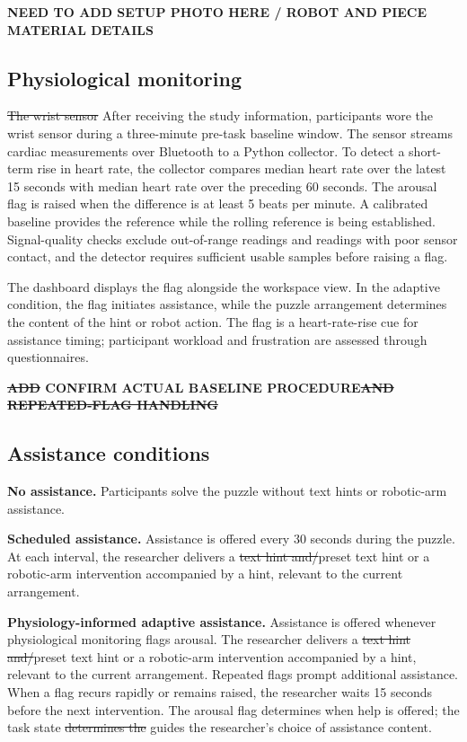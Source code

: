 \documentclass[sigconf,anonymous,balance=false]{aamas} %
\DeclareRobustCommand{\DIFadd}[1]{{\color{reviewadd}#1}} %
\DeclareRobustCommand{\DIFdel}[1]{{\color{reviewdel}\sout{#1}}} %
\providecommand{\DIFaddbegin}{} %
\providecommand{\DIFaddend}{} %
\providecommand{\DIFdelbegin}{} %
\providecommand{\DIFdelend}{} %
\providecommand{\DIFscaledelfig}{0.5}
\newlength{\DIFdelgraphicswidth} %
\newlength{\DIFdelgraphicsheight} %
\providecommand{\DIFaddincludegraphics}[2][]{{\color{blue}\fbox{\DIFOincludegraphics[#1]{#2}}}} %
\providecommand{\DIFdelincludegraphics}[2][]{%
\sbox{\DIFdelgraphicsbox}{\DIFOincludegraphics[#1]{#2}}%
\settoboxwidth{\DIFdelgraphicswidth}{\DIFdelgraphicsbox} %
\settoboxtotalheight{\DIFdelgraphicsheight}{\DIFdelgraphicsbox} %
\scalebox{\DIFscaledelfig}{%
\parbox[b]{\DIFdelgraphicswidth}{\usebox{\DIFdelgraphicsbox}\\[-\baselineskip] \rule{\DIFdelgraphicswidth}{0em}}\llap{\resizebox{\DIFdelgraphicswidth}{\DIFdelgraphicsheight}{%
\setlength{\unitlength}{\DIFdelgraphicswidth}%
\begin{picture}(1,1)%
\thicklines\linethickness{2pt} %
{\color[rgb]{1,0,0}\put(0,0){\framebox(1,1){}}}%
{\color[rgb]{1,0,0}\put(0,0){\line( 1,1){1}}}%
{\color[rgb]{1,0,0}\put(0,1){\line(1,-1){1}}}%
\end{picture}%
}\hspace*{3pt}}} %
} %
\DeclareRobustCommand{\DIFaddbegin}{\DIFOaddbegin \let\includegraphics\DIFaddincludegraphics} %
\DeclareRobustCommand{\DIFaddend}{\DIFOaddend \let\includegraphics\DIFOincludegraphics} %
\DeclareRobustCommand{\DIFdelbegin}{\DIFOdelbegin \let\includegraphics\DIFdelincludegraphics} %
\DeclareRobustCommand{\DIFdelend}{\DIFOaddend \let\includegraphics\DIFOincludegraphics} %
\begin{document}
\textbf{NEED TO ADD SETUP PHOTO HERE / ROBOT AND PIECE \DIFaddbegin \DIFadd{MATERIAL }\DIFaddend DETAILS}

\subsection{Physiological monitoring}

\DIFdelbegin \DIFdel{The wrist sensor }\DIFdelend \DIFaddbegin \DIFadd{After receiving the study information, participants wore the wrist sensor during a three-minute pre-task baseline window. The sensor }\DIFaddend streams cardiac measurements over Bluetooth to a Python collector. To detect a short-term rise in heart rate, the collector compares median heart rate over the latest 15 seconds with median heart rate over the preceding 60 seconds. The arousal flag is raised when the difference is at least 5 beats per minute. A calibrated baseline provides the reference while the rolling reference is being established. Signal-quality checks exclude out-of-range readings and readings with poor sensor contact, and the detector requires sufficient usable samples before raising a flag.

The dashboard displays the flag alongside the workspace view. In the adaptive condition, the flag initiates assistance, while the puzzle arrangement determines the content of the hint or robot action. The flag is a heart-rate-rise cue for assistance timing; participant workload and frustration are assessed through questionnaires.

\textbf{\DIFdelbegin \DIFdel{ADD }\DIFdelend \DIFaddbegin \DIFadd{CONFIRM ACTUAL }\DIFaddend BASELINE PROCEDURE\DIFdelbegin \DIFdel{AND REPEATED-FLAG HANDLING}\DIFdelend }

\subsection{Assistance conditions}

\textbf{No assistance.} Participants solve the puzzle without text hints or robotic-arm assistance.

\textbf{Scheduled assistance.} Assistance is offered every 30 seconds during the puzzle. At each interval, the researcher delivers a \DIFdelbegin \DIFdel{text hint and/}\DIFdelend \DIFaddbegin \DIFadd{preset text hint }\DIFaddend or a robotic-arm intervention \DIFaddbegin \DIFadd{accompanied by a hint, }\DIFaddend relevant to the current arrangement.

\textbf{Physiology-informed adaptive assistance.} Assistance is offered whenever physiological monitoring flags arousal. The researcher delivers a \DIFdelbegin \DIFdel{text hint and/}\DIFdelend \DIFaddbegin \DIFadd{preset text hint }\DIFaddend or a robotic-arm intervention \DIFaddbegin \DIFadd{accompanied by a hint, }\DIFaddend relevant to the current arrangement. \DIFaddbegin \DIFadd{Repeated flags prompt additional assistance. When a flag recurs rapidly or remains raised, the researcher waits 15 seconds before the next intervention. }\DIFaddend The arousal flag determines when help is offered; the task state \DIFdelbegin \DIFdel{determines the }\DIFdelend \DIFaddbegin \DIFadd{guides the researcher’s choice of }\DIFaddend assistance content.
\end{document}
